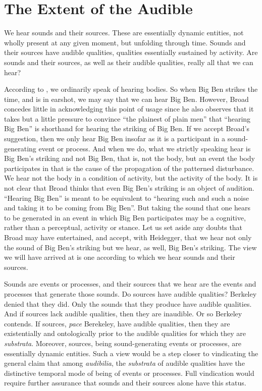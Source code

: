 
\section{The Extent of the Audible} %
\label{sec:sounds_and_their_sources}

We hear sounds and their sources. These are essentially dynamic entities, not wholly present at any given moment, but unfolding through time. Sounds and their sources have audible qualities, qualities essentially sustained by activity. Are sounds and their sources, as well as their audible qualities, really all that we can hear? 

According to \citet[4]{Broad:1952kx}, we ordinarily speak of hearing bodies. So when Big Ben strikes the time, and is in earshot, we may say that we can hear Big Ben. However, Broad concedes little in acknowledging this point of usage since he also observes that it takes but a little pressure to convince ``the plainest of plain men'' that ``hearing Big Ben'' is shorthand for hearing the striking of Big Ben. If we accept Broad's suggestion, then we only hear Big Ben insofar as it is a participant in a sound-generating event or process. And when we do, what we strictly speaking hear is Big Ben's striking and not Big Ben, that is, not the body, but an event the body participates in that is the cause of the propagation of the patterned disturbance. We hear not the body in a condition of activity, but the activity of the body. It is not clear that Broad thinks that even Big Ben's striking is an object of audition. ``Hearing Big Ben'' is meant to be equivalent to ``hearing such and such a noise and taking it to be coming from Big Ben''. But taking the sound that one hears to be generated in an event in which Big Ben participates may be a cognitive, rather than a perceptual, activity or stance. Let us set aside any doubts that Broad may have entertained, and accept, with Heidegger, that we hear not only the sound of Big Ben's striking but we hear, as well, Big Ben's striking. The view we will have arrived at is one according to which we hear sounds and their sources. 

Sounds are events or processes, and their sources that we hear are the events and processes that generate those sounds. Do sources have audible qualities? Berkeley denied that they did. Only the sounds that they produce have audible qualities. And if sources lack audible qualities, then they are inaudible. Or so Berkeley contends. If sources, \emph{pace} Berekeley, have audible qualities, then they are existentially and ontologically prior to the audible qualities for which they are \emph{substrata}. Moreover, sources, being sound-generating events or processes, are essentially dynamic entities. Such a view would be a step closer to vindicating the general claim that among \emph{audibilia}, the \emph{substrata} of audible qualities have the distinctive temporal mode of being of events or processes. Full vindication would require further assurance that sounds and their sources alone have this status.

